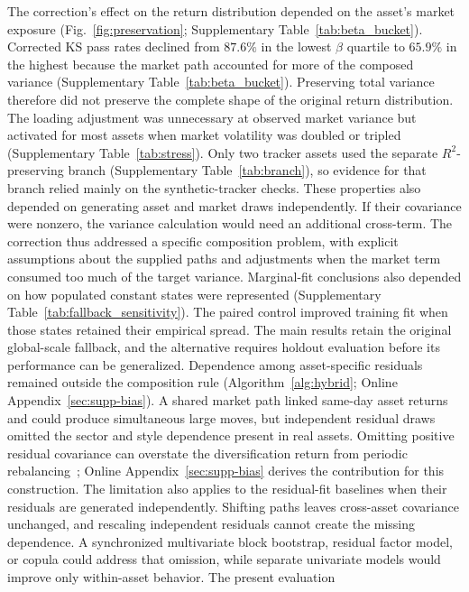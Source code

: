 The correction's effect on the return distribution depended on the
asset's market exposure (Fig.~\ref{fig:preservation};
Supplementary Table~\ref{tab:beta_bucket}). Corrected KS pass rates declined from
$87.6\%$ in the lowest $\beta$ quartile to $65.9\%$ in the highest
because the market path accounted for more of the composed variance
(Supplementary Table~\ref{tab:beta_bucket}). Preserving total variance therefore
did not preserve the complete shape of the original return
distribution. The loading adjustment was unnecessary at observed
market variance but activated for most assets when market volatility
was doubled or tripled (Supplementary Table~\ref{tab:stress}). Only two tracker
assets used the separate $R^2$-preserving branch
(Supplementary Table~\ref{tab:branch}), so evidence for that branch relied mainly
on the synthetic-tracker checks. These properties also depended on
generating asset and market draws independently. If their covariance
were nonzero, the variance calculation would need an additional
cross-term. The correction thus addressed a specific composition
problem, with explicit assumptions about the supplied paths and
adjustments when the market term consumed too much of the target
variance.
Marginal-fit conclusions also depended on how populated constant
states were represented (Supplementary Table~\ref{tab:fallback_sensitivity}). The paired control improved training fit
when those states retained their empirical spread. The main results
retain the original global-scale fallback, and the alternative
requires holdout evaluation before its performance can be generalized.
Dependence among asset-specific residuals remained outside the
composition rule (Algorithm~\ref{alg:hybrid}; Online
Appendix~\ref{sec:supp-bias}). A shared market path linked same-day asset returns and
could produce simultaneous large moves, but independent residual
draws omitted the sector and style dependence present in real assets.
Omitting positive residual covariance can overstate the diversification
return from periodic rebalancing~\cite{boothFama1992,
boucheyNemtchinovWong2015, markowitz1976longRun}; Online
Appendix~\ref{sec:supp-bias} derives the contribution for this
construction. The limitation also applies to the residual-fit
baselines when their residuals are generated independently. Shifting
paths leaves cross-asset covariance unchanged, and rescaling
independent residuals cannot create the missing dependence. A
synchronized multivariate block bootstrap, residual factor model, or
copula could address that omission, while separate univariate models
would improve only within-asset behavior. The present evaluation
